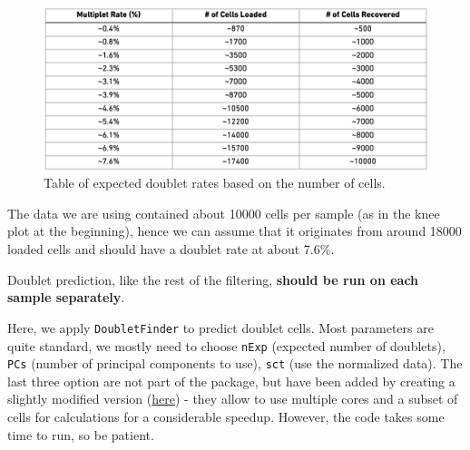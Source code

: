 \documentclass[
  letterpaper,
  DIV=11,
  numbers=noendperiod]{scrartcl}
\begin{document}
\begin{figure}

{\centering \includegraphics{./images/doublet_rates.png}

}

\caption{\label{fig-doubletrates}Table of expected doublet rates based
on the number of cells.}

\end{figure}

The data we are using contained about 10000 cells per sample (as in the
knee plot at the beginning), hence we can assume that it originates from
around 18000 loaded cells and should have a doublet rate at about 7.6\%.

\begin{tcolorbox}[enhanced jigsaw, arc=.35mm, toprule=.15mm, breakable, bottomrule=.15mm, title=\textcolor{quarto-callout-note-color}{\faInfo}\hspace{0.5em}{Note}, opacityback=0, colframe=quarto-callout-note-color-frame, opacitybacktitle=0.6, leftrule=.75mm, titlerule=0mm, left=2mm, bottomtitle=1mm, toptitle=1mm, colback=white, rightrule=.15mm, colbacktitle=quarto-callout-note-color!10!white, coltitle=black]

Doublet prediction, like the rest of the filtering, \textbf{should be
run on each sample separately}.

\end{tcolorbox}

Here, we apply \texttt{DoubletFinder} to predict doublet cells. Most
parameters are quite standard, we mostly need to choose \texttt{nExp}
(expected number of doublets), \texttt{PCs} (number of principal
components to use), \texttt{sct} (use the normalized data). The last
three option are not part of the package, but have been added by
creating a slightly modified version
(\href{https://github.com/SamueleSoraggi/DoubletFinder}{here}) - they
allow to use multiple cores and a subset of cells for calculations for a
considerable speedup. However, the code takes some time to run, so be
patient.
\end{document}
